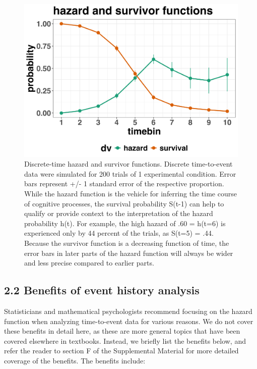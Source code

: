 \documentclass[
  man, donotrepeattitle,floatsintext]{apa6}
\begin{document}
\begin{figure}[H]

{\centering \includegraphics[width=0.8\linewidth,height=0.67\textheight,]{../sims/figures/haz_surv_single} 

}

\caption{Discrete-time hazard and survivor functions. Discrete time-to-event data were simulated for 200 trials of 1 experimental condition. Error bars represent +/- 1 standard error of the respective proportion. While the hazard function is the vehicle for inferring the time course of cognitive processes, the survival probability S(t-1) can help to qualify or provide context to the interpretation of the hazard probability h(t). For example, the high hazard of .60 = h(t=6) is experienced only by 44 percent of the trials, as S(t=5) = .44.
Because the survivor function is a decreasing function of time, the error bars in later parts of the hazard function will always be wider and less precise compared to earlier parts.}\label{fig:plot2}
\end{figure}

\subsection{2.2 Benefits of event history analysis}\label{benefits-of-event-history-analysis}

Statisticians and mathematical psychologists recommend focusing on the hazard function when analyzing time-to-event data for various reasons. We do not cover these benefits in detail here, as these are more general topics that have been covered elsewhere in textbooks. Instead, we briefly list the benefits below, and refer the reader to section F of the Supplemental Material for more detailed coverage of the benefits. The benefits include:
\end{document}
